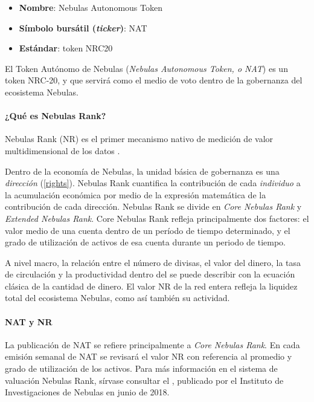 \begin{itemize}
	\item \textbf{Nombre}: Nebulas Autonomous Token
	\item \textbf{Símbolo bursátil (\textit{ticker})}: NAT
	\item \textbf{Estándar}: token NRC20
\end{itemize}

El Token Autónomo de Nebulas (\textit{Nebulas Autonomous Token, o NAT}) es un token NRC-20, y que servirá como el medio de voto dentro de la gobernanza del ecosistema Nebulas.

\begin{center}
	\colorbox{yellow!30}{
	\begin{minipage}[c]{.8\textwidth}
		\paragraph{¿Qué es Nebulas Rank?}
		Nebulas Rank (NR) es el primer mecanismo nativo \onchain de medición de valor multidimensional de los datos \blockchain.

		Dentro de la economía de Nebulas, la unidad básica de gobernanza es una \emph{dirección}
		(\ref{rights}). Nebulas Rank cuantifica la contribución de cada
		\emph{individuo} a la acumulación económica por medio de la expresión matemática de la contribución de cada dirección. Nebulas Rank se divide en \emph{Core
		Nebulas Rank} y \emph{Extended Nebulas Rank}. Core Nebulas Rank refleja principalmente dos factores: el valor medio de una cuenta dentro de un período de tiempo determinado, y el grado de utilización de activos de esa cuenta durante un periodo de tiempo.

		A nivel macro, la relación entre el número de divisas, el valor del dinero, la tasa de circulación y la productividad dentro del \blockchain se puede describir con la ecuación clásica de la cantidad de dinero. El valor NR de la red entera refleja la liquidez total del ecosistema Nebulas, como así también su actividad.

		\paragraph{NAT y NR}

		La publicación de NAT se refiere principalmente a \emph{Core Nebulas Rank}. En cada emisión semanal de NAT se revisará el valor NR con referencia al promedio y grado de utilización de los activos. Para más información en el sistema de valuación Nebulas Rank, sírvase consultar el \yellowp, publicado por el Instituto de Investigaciones de Nebulas en junio de 2018.


\end{minipage}}
\end{center}
